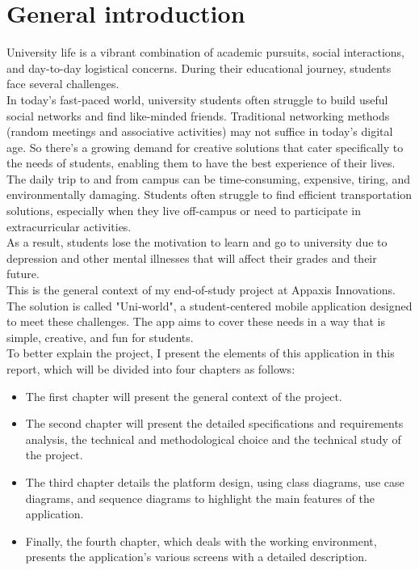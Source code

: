 \chapter*{General introduction}

University life is a vibrant combination of academic pursuits, social interactions, and day-to-day logistical concerns. During their educational journey, students face several challenges.\\

In today's fast-paced world, university students often struggle to build useful social networks and find like-minded friends. Traditional networking methods (random meetings and associative activities) may not suffice in today's digital age. So there's a growing demand for creative solutions that cater specifically to the needs of students, enabling them to have the best experience of their lives.\\

The daily trip to and from campus can be time-consuming, expensive, tiring, and environmentally damaging. Students often struggle to find efficient transportation solutions, especially when they live off-campus or need to participate in extracurricular activities.\\

As a result, students lose the motivation to learn and go to university due to depression and other mental illnesses that will affect their grades and their future.\\

This is the general context of my end-of-study project at Appaxis Innovations. The solution is called "Uni-world", a student-centered mobile application designed to meet these challenges. The app aims to cover these needs in a way that is simple, creative, and fun for students.\\

To better explain the project, I present the elements of this application in this report, which will be divided into four chapters as follows:\\

\begin{itemize}


    \item The first chapter will present the general context of the project.\\ 
    \item The second chapter will present the detailed specifications and requirements analysis, the technical and methodological choice and the technical study of the project.\\
    \item The third chapter details the platform design, using class diagrams, use case diagrams, and sequence diagrams to highlight the main features of the application.\\
    \item Finally, the fourth chapter, which deals with the working environment, presents the application's various screens with a detailed description.\\
\end{itemize}
